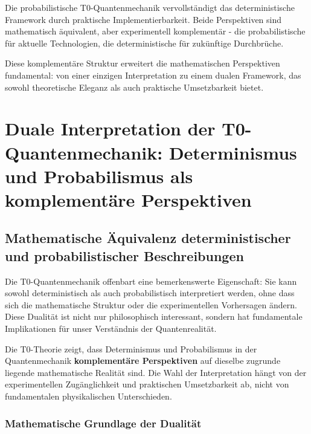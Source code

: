\documentclass[12pt,a4paper]{article}
\theoremstyle{definition}
\theoremstyle{remark}
\begin{document}
\begin{tcolorbox}[colback=green!5!white,colframe=green!75!black,title=Komplementäre Vollständigkeit]
	Die probabilistische T0-Quantenmechanik vervollständigt das deterministische Framework durch praktische Implementierbarkeit. Beide Perspektiven sind mathematisch äquivalent, aber experimentell komplementär - die probabilistische für aktuelle Technologien, die deterministische für zukünftige Durchbrüche.
\end{tcolorbox}

Diese komplementäre Struktur erweitert die mathematischen Perspektiven fundamental: von einer einzigen Interpretation zu einem dualen Framework, das sowohl theoretische Eleganz als auch praktische Umsetzbarkeit bietet.
\section{Duale Interpretation der T0-Quantenmechanik: Determinismus und Probabilismus als komplementäre Perspektiven}

\subsection{Mathematische Äquivalenz deterministischer und probabilistischer Beschreibungen}

Die T0-Quantenmechanik offenbart eine bemerkenswerte Eigenschaft: Sie kann sowohl deterministisch als auch probabilistisch interpretiert werden, ohne dass sich die mathematische Struktur oder die experimentellen Vorhersagen ändern. Diese Dualität ist nicht nur philosophisch interessant, sondern hat fundamentale Implikationen für unser Verständnis der Quantenrealität.

\begin{tcolorbox}[colback=purple!5!white,colframe=purple!75!black,title=Zentrale Erkenntnis der dualen Interpretation]
	Die T0-Theorie zeigt, dass Determinismus und Probabilismus in der Quantenmechanik \textbf{komplementäre Perspektiven} auf dieselbe zugrunde liegende mathematische Realität sind. Die Wahl der Interpretation hängt von der experimentellen Zugänglichkeit und praktischen Umsetzbarkeit ab, nicht von fundamentalen physikalischen Unterschieden.
\end{tcolorbox}

\subsubsection{Mathematische Grundlage der Dualität}
\end{document}
